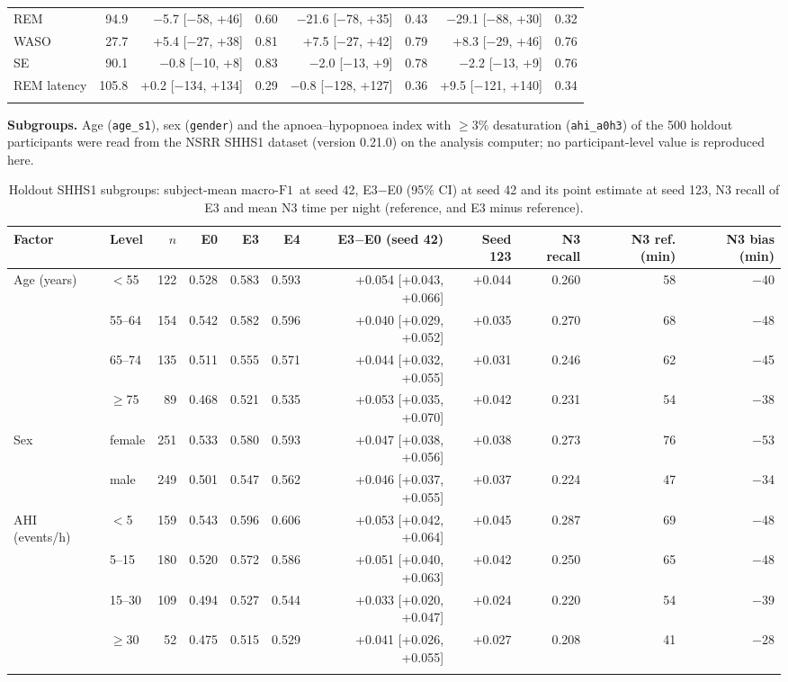 \documentclass[10pt,a4paper]{article}
\newcommand{\mf}{\ensuremath{\mathrm{macro\text{-}F1}}}
\newcommand{\ci}{95\% CI}
\begin{document}
\begin{table}[H]
\begin{tabular}{lrrrrrrr}
REM & 94.9 & $-$5.7 [$-$58, +46] & 0.60 & $-$21.6 [$-$78, +35] & 0.43 & $-$29.1 [$-$88, +30] & 0.32 \\
WASO & 27.7 & +5.4 [$-$27, +38] & 0.81 & +7.5 [$-$27, +42] & 0.79 & +8.3 [$-$29, +46] & 0.76 \\
SE & 90.1 & $-$0.8 [$-$10, +8] & 0.83 & $-$2.0 [$-$13, +9] & 0.78 & $-$2.2 [$-$13, +9] & 0.76 \\
REM latency & 105.8 & +0.2 [$-$134, +134] & 0.29 & $-$0.8 [$-$128, +127] & 0.36 & +9.5 [$-$121, +140] & 0.34 \\
\addlinespace
\bottomrule
\end{tabular}
\end{table}


\textbf{Subgroups.} Age (\texttt{age\_s1}), sex (\texttt{gender}) and the apnoea--hypopnoea index
with $\geq3\%$ desaturation (\texttt{ahi\_a0h3}) of the 500 holdout participants were read from the NSRR SHHS1
dataset (version 0.21.0) on the analysis computer; no participant-level value is reproduced here.

\begin{table}[H]
\centering\scriptsize
\caption{Holdout SHHS1 subgroups: subject-mean \mf\ at seed 42, E3$-$E0 (\ci) at seed 42 and its point estimate at
seed 123, N3 recall of E3 and mean N3 time per night (reference, and E3 minus reference).}
\label{tab:sup_subgroups}
\setlength{\tabcolsep}{3pt}
\begin{tabular}{llrrrrrrrrr}
\toprule
Factor & Level & $n$ & E0 & E3 & E4 & E3$-$E0 (seed 42) & Seed 123 & N3 recall & N3 ref. (min) & N3 bias (min) \\
\midrule
Age (years) & $<$55 & 122 & 0.528 & 0.583 & 0.593 & +0.054 [+0.043, +0.066] & +0.044 & 0.260 & 58 & $-$40 \\
 & 55--64 & 154 & 0.542 & 0.582 & 0.596 & +0.040 [+0.029, +0.052] & +0.035 & 0.270 & 68 & $-$48 \\
 & 65--74 & 135 & 0.511 & 0.555 & 0.571 & +0.044 [+0.032, +0.055] & +0.031 & 0.246 & 62 & $-$45 \\
 & $\geq$75 & 89 & 0.468 & 0.521 & 0.535 & +0.053 [+0.035, +0.070] & +0.042 & 0.231 & 54 & $-$38 \\
\addlinespace
Sex & female & 251 & 0.533 & 0.580 & 0.593 & +0.047 [+0.038, +0.056] & +0.038 & 0.273 & 76 & $-$53 \\
 & male & 249 & 0.501 & 0.547 & 0.562 & +0.046 [+0.037, +0.055] & +0.037 & 0.224 & 47 & $-$34 \\
\addlinespace
AHI (events/h) & $<$5 & 159 & 0.543 & 0.596 & 0.606 & +0.053 [+0.042, +0.064] & +0.045 & 0.287 & 69 & $-$48 \\
 & 5--15 & 180 & 0.520 & 0.572 & 0.586 & +0.051 [+0.040, +0.063] & +0.042 & 0.250 & 65 & $-$48 \\
 & 15--30 & 109 & 0.494 & 0.527 & 0.544 & +0.033 [+0.020, +0.047] & +0.024 & 0.220 & 54 & $-$39 \\
 & $\geq$30 & 52 & 0.475 & 0.515 & 0.529 & +0.041 [+0.026, +0.055] & +0.027 & 0.208 & 41 & $-$28 \\
\addlinespace
\bottomrule
\end{tabular}
\end{table}
\end{document}
